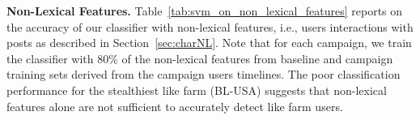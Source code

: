 \documentclass[twocolumn,10pt,letterpaper]{article}
\newcommand{\descr}[1]{\smallskip\noindent\textbf{#1}}
\begin{document}
\begin{table*}[t]
\tabcolsep=0.11cm
  \begin{center}
	\small
{}
%
    \caption{Effectiveness of non-lexical features (+SVM) in detecting like farm users.}
    \label{tab:svm_on_non_lexical_features}
      \end{center}
\end{table*}


\descr{Non-Lexical Features.}
Table~\ref{tab:svm_on_non_lexical_features} reports on the accuracy of our classifier with non-lexical features, i.e., users interactions with posts as described in Section~\ref{sec:charNL}. Note that for each campaign, we train the classifier with 80\% of the non-lexical features from baseline and campaign training sets derived from the campaign users timelines. The poor classification performance for the stealthiest like farm (BL-USA) suggests that non-lexical features alone are not sufficient to accurately detect like farm users.
\end{document}
